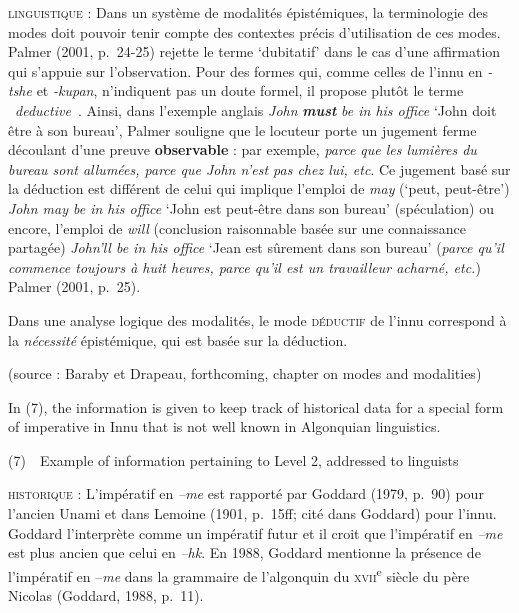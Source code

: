 \documentclass[letterpaper]{article}
\begin{document}
\textsc{linguistique : }Dans un syst\`eme de modalit\'es \'epist\'emiques, la terminologie des modes doit pouvoir tenir compte des contextes pr\'ecis d{\textquoteright}utilisation de ces modes. Palmer (2001, p.~24-25) rejette le terme {\textquoteleft}dubitatif{\textquoteright} dans le cas d{\textquoteright}une affirmation qui s{\textquoteright}appuie sur l{\textquoteright}observation. Pour des formes qui, comme celles de l{\textquoteright}innu en \textit{{}-tshe }et \textit{{}-kupan}, n{\textquoteright}indiquent pas un doute formel, il propose plut\^ot le terme {\guillemotleft}~\textit{deductive~}{\guillemotright}. Ainsi, dans l{\textquoteright}exemple anglais \textit{John }\textbf{\textit{must}}\textit{ be in his office }{\textquoteleft}John doit \^etre \`a son bureau{\textquoteright}, Palmer souligne que le locuteur porte un jugement ferme d\'ecoulant d{\textquoteright}une preuve \textbf{observable} : par exemple, \textit{parce que les lumi\`eres du bureau sont allum\'ees, parce que John n{\textquoteright}est pas chez lui, etc}. Ce jugement bas\'e sur la d\'eduction est diff\'erent de celui qui implique l{\textquoteright}emploi de \textit{may} ({\textquoteleft}peut, peut-\^etre{\textquoteright}) \textit{John may be in his office} {\textquoteleft}John est peut-\^etre dans son bureau{\textquoteright} (sp\'eculation) ou encore, l{\textquoteright}emploi de \textit{will} (conclusion raisonnable bas\'ee sur une connaissance partag\'ee) \textit{John{\textquoteright}ll be in his office} {\textquoteleft}Jean est s\^urement dans son bureau{\textquoteright} (\textit{parce qu{\textquoteright}il commence toujours \`a huit heures, parce qu{\textquoteright}il est un travailleur acharn\'e, etc.}) Palmer (2001, p.~25).

Dans une analyse logique des modalit\'es, le mode \textsc{d\'eductif} de l{\textquoteright}innu correspond \`a la \textit{n\'ecessit\'e} \'epist\'emique, qui est bas\'ee sur la d\'eduction.

(source : Baraby et Drapeau, forthcoming, chapter on modes and modalities)

In (7), the information is given to keep track of historical data for a special form of imperative in Innu that is not well known in Algonquian linguistics.

(7)\ \ Example of information pertaining to Level 2, addressed to linguists

\textsc{historique : }L{\textquoteright}imp\'eratif en \textit{{}--me} est rapport\'e par Goddard (1979, p.~90) pour l{\textquoteright}ancien Unami et dans Lemoine (1901, p.~15ff; cit\'e dans Goddard) pour l{\textquoteright}innu. Goddard l{\textquoteright}interpr\`ete comme un imp\'eratif futur et il croit que l{\textquoteright}imp\'eratif en \textit{{}--me} est plus ancien que celui en \textit{{}--hk}. En 1988, Goddard mentionne la pr\'esence de l{\textquoteright}imp\'eratif en --\textit{me} dans la grammaire de l{\textquoteright}algonquin du \textsc{xvii}\textsuperscript{e} si\`ecle du p\`ere Nicolas (Goddard, 1988, p.~11). 
\end{document}
